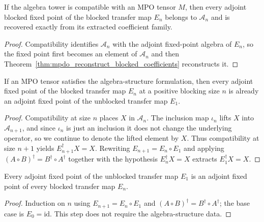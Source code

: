 \begin{theorem}%
    \label{thm:mpdo_fixedpoint_coefficients_reconstruct}
    \leanok
    If the algebra tower is compatible with an MPO tensor $M$, then every adjoint
    blocked fixed point of the blocked transfer map $E_n$ belongs to
    $\mathcal{A}_n$ and is recovered exactly from its extracted coefficient
    family.
\end{theorem}
\begin{proof}\leanok
    Compatibility identifies $\mathcal{A}_n$ with the adjoint fixed-point algebra of
    $E_n$, so the fixed point first becomes an element of $\mathcal{A}_n$ and then
    Theorem~\ref{thm:mpdo_reconstruct_blocked_coefficients} reconstructs it.
\end{proof}

\begin{theorem}%
    \label{thm:mpdo_adjoint_fix_descent}
    \leanok
    If an MPO tensor satisfies the algebra-structure formulation, then every
    adjoint fixed point of the blocked transfer map $E_n$ at a positive
    blocking size $n$ is already an adjoint fixed point of the unblocked
    transfer map $E_1$.
\end{theorem}
\begin{proof}\leanok
    Compatibility at size $n$ places $X$ in $\mathcal{A}_n$. The inclusion map
    $\iota_n$ lifts $X$ into $\mathcal{A}_{n+1}$, and since $\iota_n$ is just an
    inclusion it does not change the underlying operator, so we continue to
    denote the lifted element by $X$. Thus compatibility at size $n + 1$ yields
    $E_{n+1}^{\dagger} X = X$. Rewriting $E_{n+1} = E_n \circ E_1$ and applying
    $(A \circ B)^{\dagger} = B^{\dagger} \circ A^{\dagger}$ together with the
    hypothesis $E_n^{\dagger} X = X$ extracts $E_1^{\dagger} X = X$.
\end{proof}

\begin{lemma}%
    \label{lem:mpdo_adjoint_fix_reverse}
    \leanok
    Every adjoint fixed point of the unblocked transfer map $E_1$ is an
    adjoint fixed point of every blocked transfer map $E_n$.
\end{lemma}
\begin{proof}\leanok
    Induction on $n$ using $E_{n+1} = E_n \circ E_1$ and
    $(A \circ B)^{\dagger} = B^{\dagger} \circ A^{\dagger}$; the base case is
    $E_0 = \mathrm{id}$. This step does not require the algebra-structure data.
\end{proof}

